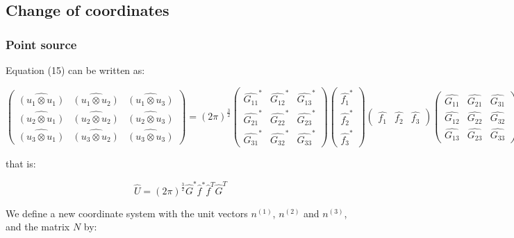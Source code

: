 \documentclass[workdone.tex]{subfiles}
\begin{document}
\subsection{Change of coordinates}

\subsubsection{Point source}

Equation (15) can be written as:

\begin{equation}
\begin{pmatrix}
\hat{(u_1 \otimes u_1)} & \hat{(u_1 \otimes u_2)} & \hat{(u_1 \otimes u_3)} \\
\hat{(u_2 \otimes u_1)} & \hat{(u_2 \otimes u_2)} & \hat{(u_2 \otimes u_3)} \\
\hat{(u_3 \otimes u_1)} & \hat{(u_3 \otimes u_2)} & \hat{(u_3 \otimes u_3)}
\end{pmatrix} = (2 \pi)^{\frac{3}{2}}
\begin{pmatrix}
\hat{G_{11}}^* & \hat{G_{12}}^* & \hat{G_{13}}^* \\
\hat{G_{21}}^* & \hat{G_{22}}^* & \hat{G_{23}}^* \\
\hat{G_{31}}^* & \hat{G_{32}}^* & \hat{G_{33}}^*
\end{pmatrix}
\begin{pmatrix}
\hat{f_1}^* \\
\hat{f_2}^* \\
\hat{f_3}^*
\end{pmatrix}
\begin{pmatrix}
\hat{f_1} & \hat{f_2} & \hat{f_3}
\end{pmatrix}
\begin{pmatrix}
\hat{G_{11}} & \hat{G_{21}} & \hat{G_{31}} \\
\hat{G_{12}} & \hat{G_{22}} & \hat{G_{32}} \\
\hat{G_{13}} & \hat{G_{23}} & \hat{G_{33}}
\end{pmatrix}
\end{equation}

that is:

\begin{equation}
\hat{U} = (2 \pi)^{\frac{3}{2}} \hat{G}^* \hat{f}^* \hat{f}^T \hat{G}^T
\end{equation}

We define a new coordinate system with the unit vectors $n^{(1)}$, $n^{(2)}$ and $n^{(3)}$, and the matrix $N$ by:
\end{document}

